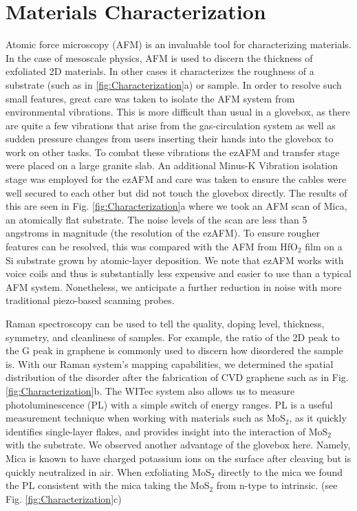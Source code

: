 \section{\label{sec:level2}Materials Characterization}
Atomic force microscopy (AFM) is an invaluable tool for characterizing materials. In the case of mesoscale physics, AFM is used to discern the thickness of exfoliated 2D materials. In other cases it characterizes the roughness of a substrate (such as in \ref{fig:Characterization}a) or sample. In order to resolve such small features, great care was taken to isolate the AFM system from environmental vibrations. This is more difficult than usual in a glovebox, as there are quite a few vibrations that arise from the gas-circulation system as well as sudden pressure changes from users inserting their hands into the glovebox to work on other tasks. To combat these vibrations the ezAFM and transfer stage were placed on a large granite slab. An additional Minus-K Vibration isolation stage was employed for the ezAFM and care was taken to ensure the cables were well secured to each other but did not touch the glovebox directly. The results of this are seen in Fig. \ref{fig:Characterization}a where we took an AFM scan of Mica, an atomically flat substrate. The noise levels of the scan are less than 5 angstroms in magnitude (the resolution of the ezAFM). To ensure rougher features can be resolved, this was compared with the AFM from HfO$_{2}$ film on a Si substrate grown by atomic-layer deposition. We note that ezAFM works with voice coils and thus is substantially less expensive and easier to use than a typical AFM system. Nonetheless, we anticipate a further reduction in noise with more traditional piezo-based scanning probes. 
\par
Raman spectroscopy can be used to tell the quality, doping level, thickness, symmetry, and cleanliness of samples.\cite{Ferrari:2013jx,Shahil:2010fg,Zhou2018,lei2019high,PhysRevB.82.064503,BTSAPLlocal2016} For example, the ratio of the 2D peak to the G peak in graphene is commonly used to discern how disordered the sample is.\cite{wu2018raman} With our Raman system's mapping capabilities, we determined the spatial distribution of the disorder after the fabrication of CVD graphene such as in Fig. \ref{fig:Characterization}b. The WITec system also allows us to measure photoluminescence (PL) with a simple switch of energy ranges. PL is a useful measurement technique when working with materials such as MoS$_{2}$, as it quickly identifies single-layer flakes, and provides insight into the interaction of MoS$_{2}$ with the substrate.\cite{YHlee2017review,yin2011single,Butler:2013ha} We observed another advantage of the glovebox here. Namely, Mica is known to have charged potassium ions on the surface after cleaving but is quickly neutralized in air.\cite{Lui2009} When exfoliating MoS$_{2}$ directly to the mica we found the PL consistent with the mica taking the MoS$_{2}$ from n-type to intrinsic.\cite{Mak2013,Ross2013} (see Fig. \ref{fig:Characterization}c) 

